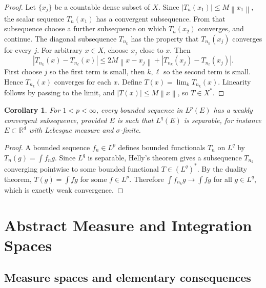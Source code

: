 \documentclass[11pt,openany]{book}
\numberwithin{equation}{chapter}
\theoremstyle{definition}
\theoremstyle{plain}
\newtheorem{corollary}[definition]{Corollary}
\theoremstyle{remark}
\newcommand{\R}{\mathbb{R}}
\newcommand{\1}{\mathbf{1}}
\newcommand{\abs}[1]{\left\lvert #1\right\rvert}
\newcommand{\norm}[1]{\left\lVert #1\right\rVert}
\begin{document}
\begin{proof}
Let \(\{x_j\}\) be a countable dense subset of \(X\).  Since \(\abs{T_n(x_1)}\le M\norm{x_1}\), the scalar sequence \(T_n(x_1)\) has a convergent subsequence.  From that subsequence choose a further subsequence on which \(T_n(x_2)\) converges, and continue.  The diagonal subsequence \(T_{n_k}\) has the property that \(T_{n_k}(x_j)\) converges for every \(j\).  For arbitrary \(x\in X\), choose \(x_j\) close to \(x\).  Then
\[
    \abs{T_{n_k}(x)-T_{n_\ell}(x)}
    \le 2M\norm{x-x_j}+\abs{T_{n_k}(x_j)-T_{n_\ell}(x_j)}.
\]
First choose \(j\) so the first term is small, then \(k,\ell\) so the second term is small.  Hence \(T_{n_k}(x)\) converges for each \(x\).  Define \(T(x)=\lim_kT_{n_k}(x)\).  Linearity follows by passing to the limit, and \(\abs{T(x)}\le M\norm x\), so \(T\in X^*\).
\end{proof}

\begin{corollary}
For \(1<p<\infty\), every bounded sequence in \(L^p(E)\) has a weakly convergent subsequence, provided \(E\) is such that \(L^q(E)\) is separable, for instance \(E\subset\R^d\) with Lebesgue measure and \(\sigma\)-finite.
\end{corollary}

\begin{proof}
A bounded sequence \(f_n\in L^p\) defines bounded functionals \(T_n\) on \(L^q\) by \(T_n(g)=\int f_ng\).  Since \(L^q\) is separable, Helly's theorem gives a subsequence \(T_{n_k}\) converging pointwise to some bounded functional \(T\in(L^q)^*\).  By the duality theorem, \(T(g)=\int fg\) for some \(f\in L^p\).  Therefore \(\int f_{n_k}g\to\int fg\) for all \(g\in L^q\), which is exactly weak convergence.
\end{proof}

\chapter{Abstract Measure and Integration Spaces}

\section{Measure spaces and elementary consequences}
\end{document}
